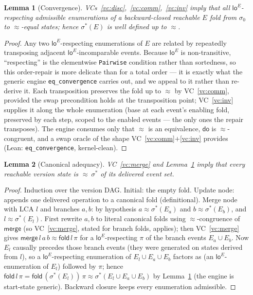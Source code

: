 \documentclass[11pt]{article}
\newtheorem{lemma}{Lemma}
\theoremstyle{definition}
\theoremstyle{remark}
\newcommand{\st}{\sigma}
\newcommand{\ini}{\st_0}
\newcommand{\dodo}{\mathsf{do}}
\newcommand{\merge}{\mathsf{merge}}
\newcommand{\eqobs}{\approx}
\newcommand{\loE}{\mathsf{lo}^{E}}
\newcommand{\fold}{\mathsf{fold}}
\newcommand{\sigmacan}{\st^{\ast}}
\newcommand{\lean}[1]{\texttt{#1}}
\begin{document}
\begin{lemma}[Convergence]\label{lem:conv}
VCs~\ref{vc:disc},~\ref{vc:comm},~\ref{vc:inv} imply that all $\loE$-respecting admissible
enumerations of a backward-closed reachable $E$ fold from $\ini$ to $\eqobs$-equal states;
hence $\sigmacan(E)$ is well defined up to $\eqobs$.
\end{lemma}
\begin{proof}
Any two $\loE$-respecting enumerations of $E$ are related by repeatedly transposing adjacent
$\loE$-incomparable events. Because $\loE$ is non-transitive, ``respecting'' is the elementwise
\lean{Pairwise} condition rather than sortedness, so this order-repair is more delicate than
for a total order --- it is exactly what the generic engine \lean{eq\_convergence} carries out,
and we appeal to it rather than re-derive it. Each transposition preserves the fold up to
$\eqobs$ by VC~\ref{vc:comm}, provided the swap precondition holds at the transposition point;
VC~\ref{vc:inv} supplies it along the whole enumeration (base at each event's enabling fold,
preserved by each step, scoped to the enabled events --- the only ones the repair transposes).
The engine consumes only that $\eqobs$ is an equivalence, $\dodo$ is $\eqobs$-congruent, and a
swap oracle of the shape VC~\ref{vc:comm}$+$\ref{vc:inv} provides (Lean: \lean{eq\_convergence},
kernel-clean).
\end{proof}

\begin{lemma}[Canonical adequacy]\label{lem:adeq}
VC~\ref{vc:merge} and Lemma~\ref{lem:conv} imply that every reachable version state is
$\eqobs\ \sigmacan$ of its delivered event set.
\end{lemma}
\begin{proof}
Induction over the version DAG. Initial: the empty fold. Update node: appends one delivered
operation to a canonical fold (definitional). Merge node with LCA $l$ and branches $a,b$: by
hypothesis $a \eqobs \sigmacan(E_a)$ and $b \eqobs \sigmacan(E_b)$, and $l \eqobs
\sigmacan(E_l)$. First rewrite $a,b$ to literal canonical folds using $\eqobs$-congruence of
$\merge$ (so VC~\ref{vc:merge}, stated for branch folds, applies); then VC~\ref{vc:merge}
gives $\merge\,l\,a\,b \eqobs \fold\,l\,\pi$ for a $\loE$-respecting $\pi$ of the branch
events $E_a \cup E_b$. Now $E_l$ causally precedes those branch events (they were generated on
states derived from $l$), so a $\loE$-respecting enumeration of $E_l \cup E_a \cup E_b$
factors as (an $\loE$-enumeration of $E_l$) followed by $\pi$; hence
$\fold\,l\,\pi = \fold\,(\sigmacan(E_l))\,\pi \eqobs \sigmacan(E_l \cup E_a \cup E_b)$ by
Lemma~\ref{lem:conv} (the engine is start-state generic). Backward closure keeps every
enumeration admissible.
\end{proof}
\end{document}
